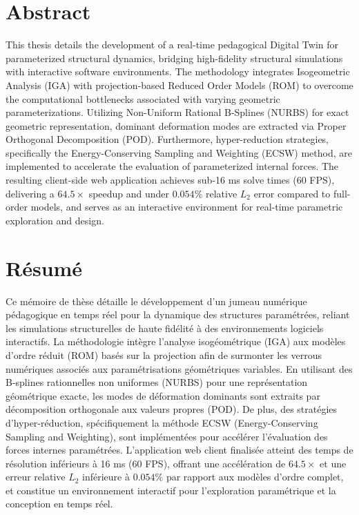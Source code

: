 \chapter*{Abstract}

\noindent This thesis details the development of a real-time pedagogical Digital Twin for parameterized structural dynamics, bridging high-fidelity structural simulations with interactive software environments. The methodology integrates Isogeometric Analysis (IGA) with projection-based Reduced Order Models (ROM) to overcome the computational bottlenecks associated with varying geometric parameterizations. Utilizing Non-Uniform Rational B-Splines (NURBS) for exact geometric representation, dominant deformation modes are extracted via Proper Orthogonal Decomposition (POD). Furthermore, hyper-reduction strategies, specifically the Energy-Conserving Sampling and Weighting (ECSW) method, are implemented to accelerate the evaluation of parameterized internal forces. The resulting client-side web application achieves sub-16 ms solve times (60 FPS), delivering a $\mathbf{64.5\times}$ speedup and under $\mathbf{0.054\%}$ relative $L_2$ error compared to full-order models, and serves as an interactive environment for real-time parametric exploration and design.

\vspace{1.5cm}

\chapter*{Résumé}

\noindent Ce mémoire de thèse détaille le développement d'un jumeau numérique pédagogique en temps réel pour la dynamique des structures paramétrées, reliant les simulations structurelles de haute fidélité à des environnements logiciels interactifs. La méthodologie intègre l'analyse isogéométrique (IGA) aux modèles d'ordre réduit (ROM) basés sur la projection afin de surmonter les verrous numériques associés aux paramétrisations géométriques variables. En utilisant des B-splines rationnelles non uniformes (NURBS) pour une représentation géométrique exacte, les modes de déformation dominants sont extraits par décomposition orthogonale aux valeurs propres (POD). De plus, des stratégies d'hyper-réduction, spécifiquement la méthode ECSW (Energy-Conserving Sampling and Weighting), sont implémentées pour accélérer l'évaluation des forces internes paramétrées. L'application web client finalisée atteint des temps de résolution inférieurs à 16 ms (60 FPS), offrant une accélération de $\mathbf{64.5\times}$ et une erreur relative $L_2$ inférieure à $\mathbf{0.054\%}$ par rapport aux modèles d'ordre complet, et constitue un environnement interactif pour l'exploration paramétrique et la conception en temps réel.

